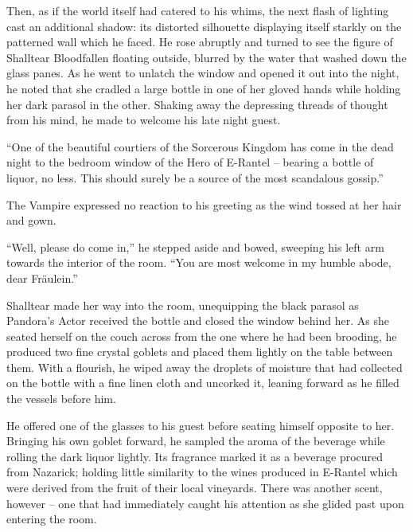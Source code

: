  

Then, as if the world itself had catered to his whims, the next flash of lighting cast an additional shadow: its distorted silhouette displaying itself starkly on the patterned wall which he faced. He rose abruptly and turned to see the figure of Shalltear Bloodfallen floating outside, blurred by the water that washed down the glass panes. As he went to unlatch the window and opened it out into the night, he noted that she cradled a large bottle in one of her gloved hands while holding her dark parasol in the other. Shaking away the depressing threads of thought from his mind, he made to welcome his late night guest.

 

“One of the beautiful courtiers of the Sorcerous Kingdom has come in the dead night to the bedroom window of the Hero of E-Rantel – bearing a bottle of liquor, no less. This should surely be a source of the most scandalous gossip.”

 

The Vampire expressed no reaction to his greeting as the wind tossed at her hair and gown.

 

“Well, please do come in,” he stepped aside and bowed, sweeping his left arm towards the interior of the room. “You are most welcome in my humble abode, dear Fräulein.”

 

Shalltear made her way into the room, unequipping the black parasol as Pandora’s Actor received the bottle and closed the window behind her. As she seated herself on the couch across from the one where he had been brooding, he produced two fine crystal goblets and placed them lightly on the table between them. With a flourish, he wiped away the droplets of moisture that had collected on the bottle with a fine linen cloth and uncorked it, leaning forward as he filled the vessels before him.

 

He offered one of the glasses to his guest before seating himself opposite to her. Bringing his own goblet forward, he sampled the aroma of the beverage while rolling the dark liquor lightly. Its fragrance marked it as a beverage procured from Nazarick; holding little similarity to the wines produced in E-Rantel which were derived from the fruit of their local vineyards. There was another scent, however – one that had immediately caught his attention as she glided past upon entering the room.

